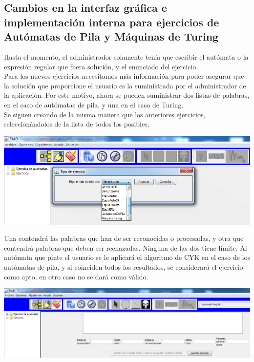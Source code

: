 \documentclass[12pt,a4paper,spanish]{book}
\begin{document}
\subsection{Cambios en la interfaz gr\'afica e implementaci\'on interna para ejercicios de Aut\'omatas de Pila y M\'aquinas de Turing}
Hasta el momento, el administrador solamente ten\'ia que escribir el aut\'omata o la expresi\'on regular que fuera soluci\'on, y el enunciado del ejercicio.\\ 
\newline
Para los nuevos ejercicios necesitamos m\'as informaci\'on para poder asegurar que la soluci\'on que proporcione el usuario es la suministrada por el administrador de la aplicaci\'on. Por este motivo, ahora se pueden suministrar dos listas de palabras, en el caso de aut\'omatas de pila, y una en el caso de Turing.\\
\newline
Se siguen creando de la misma manera que los anteriores ejercicios,\\ seleccion\'andolos de la lista de todos los posibles:\\
\begin{center}
\includegraphics[width=\textwidth]{ejer1.jpg}
\end{center}
\newpage
Una contendr\'a las palabras que han de ser reconocidas o procesadas, y otra que contendr\'a palabras que deben ser rechazadas. Ninguna de las dos tiene l\'imite.  Al aut\'omata que pinte el usuario se le aplicar\'a el algoritmo de CYK en el caso de los aut\'omatas de pila, y si coinciden todos los resultados, se considerar\'a el ejercicio como apto, en otro caso no se dar\'a como v\'alido.\\
\begin{center}
\includegraphics[width=\textwidth]{ejer2.jpg}
\end{center}
\end{document}
